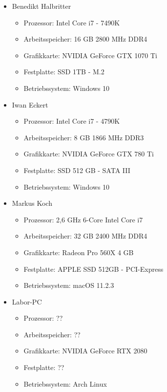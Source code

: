 \newpage

\begin{itemize}
    \item Benedikt Halbritter
    \begin{itemize}
        \item Prozessor: Intel Core i7 - 7490K
        \item Arbeitsspeicher: 16 GB 2800 MHz DDR4
        \item Grafikkarte: NVIDIA GeForce GTX 1070 Ti
        \item Festplatte: SSD 1TB - M.2
        \item Betriebssystem: Windows 10
    \end{itemize}
    \item Iwan Eckert
    \begin{itemize}
        \item Prozessor: Intel Core i7 - 4790K
        \item Arbeitsspeicher: 8 GB 1866 MHz DDR3
        \item Grafikkarte: NVIDIA GeForce GTX 780 Ti
        \item Festplatte: SSD 512 GB - SATA III
        \item Betriebssystem: Windows 10
    \end{itemize}
    \item Markus Koch
    \begin{itemize}
        \item Prozessor: 2,6 GHz 6-Core Intel Core i7
        \item Arbeitsspeicher: 32 GB 2400 MHz DDR4
        \item Grafikkarte: Radeon Pro 560X 4 GB
        \item Festplatte: APPLE SSD 512GB - PCI-Express
        \item Betriebssystem: macOS 11.2.3
    \end{itemize}
    \item Labor-PC
    \begin{itemize}
        \item Prozessor: ??
        \item Arbeitsspeicher: ??
        \item Grafikkarte: NVIDIA GeForce RTX 2080
        \item Festplatte: ??
        \item Betriebssystem: Arch Linux
    \end{itemize}
\end{itemize}


